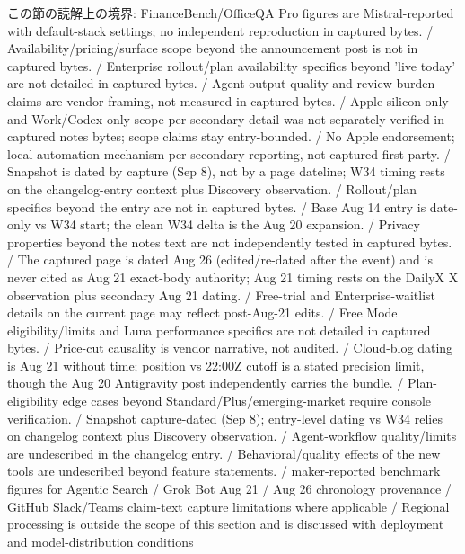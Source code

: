 \begin{claimboundary}[読解上の境界]
この節の読解上の境界: FinanceBench/OfficeQA Pro figures are Mistral-reported with default-stack settings; no independent reproduction in captured bytes. / Availability/pricing/surface scope beyond the announcement post is not in captured bytes. / Enterprise rollout/plan availability specifics beyond 'live today' are not detailed in captured bytes. / Agent-output quality and review-burden claims are vendor framing, not measured in captured bytes. / Apple-silicon-only and Work/Codex-only scope per secondary detail was not separately verified in captured notes bytes; scope claims stay entry-bounded. / No Apple endorsement; local-automation mechanism per secondary reporting, not captured first-party. / Snapshot is dated by capture (Sep 8), not by a page dateline; W34 timing rests on the changelog-entry context plus Discovery observation. / Rollout/plan specifics beyond the entry are not in captured bytes. / Base Aug 14 entry is date-only vs W34 start; the clean W34 delta is the Aug 20 expansion. / Privacy properties beyond the notes text are not independently tested in captured bytes. / The captured page is dated Aug 26 (edited/re-dated after the event) and is never cited as Aug 21 exact-body authority; Aug 21 timing rests on the DailyX X observation plus secondary Aug 21 dating. / Free-trial and Enterprise-waitlist details on the current page may reflect post-Aug-21 edits. / Free Mode eligibility/limits and Luna performance specifics are not detailed in captured bytes. / Price-cut causality is vendor narrative, not audited. / Cloud-blog dating is Aug 21 without time; position vs 22:00Z cutoff is a stated precision limit, though the Aug 20 Antigravity post independently carries the bundle. / Plan-eligibility edge cases beyond Standard/Plus/emerging-market require console verification. / Snapshot capture-dated (Sep 8); entry-level dating vs W34 relies on changelog context plus Discovery observation. / Agent-workflow quality/limits are undescribed in the changelog entry. / Behavioral/quality effects of the new tools are undescribed beyond feature statements. / maker-reported benchmark figures for Agentic Search / Grok Bot Aug 21 / Aug 26 chronology provenance / GitHub Slack/Teams claim-text capture limitations where applicable / Regional processing is outside the scope of this section and is discussed with deployment and model-distribution conditions
\end{claimboundary}
